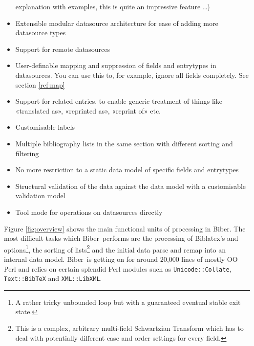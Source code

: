 \documentclass{ltxdockit}
\newcommand*{\biber}{Biber\xspace}
\newcommand*{\biblatex}{Biblatex\xspace}
\begin{document}
\begin{itemize}
  explanation with examples, this is quite an impressive feature \ldots)
\item Extensible modular datasource architecture for ease of adding
  more datasource types
\item Support for remote datasources
\item User-definable mapping and suppression of fields and entrytypes in
  datasources. You can use this to, for example, ignore all
   fields completely. See section \ref{ref:map}
\item Support for related entries, to enable generic treatment of things
  like «translated as», «reprinted as», «reprint of»
  etc.
\item Customisable labels
\item Multiple bibliography lists in the same section with different
  sorting and filtering
\item No more restriction to a static data model of specific fields and
  entrytypes
\item Structural validation of the data against the data model with a
  customisable validation model
\item Tool mode for operations on datasources directly
\end{itemize}

\noindent Figure \ref{fig:overview} shows the main functional units of
processing in \biber. The most difficult tasks which \biber\
performs are the processing of \biblatex's  and
 options\footnote{A rather tricky unbounded loop but with
  a guaranteed eventual stable exit state.}, the sorting of
lists\footnote{This is a complex, arbitrary multi-field Schwartzian
  Transform which has to deal with potentially different case and order
  settings for every field.} and the initial data parse and remap into an
internal data model. \biber\ is getting on for around 20,000 lines of
mostly OO Perl and relies on certain splendid Perl modules
such as \verb+Unicode::Collate+, \verb+Text::BibTeX+ and
\verb+XML::LibXML+.
\end{document}
